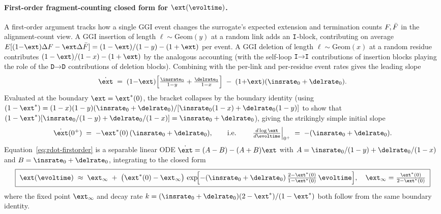 \paragraph{First-order fragment-counting closed form for $\fragext(\evoltime)$.}
A first-order argument tracks how a single GGI event changes the surrogate's
expected extension and termination counts $F, \bar F$ in the alignment-count
view.  A GGI insertion of length $\ell\sim\mathrm{Geom}(y)$ at a random link
adds an $\mathtt{I}$-block, contributing on average $E[(1{-}\fragext)\Delta F -
\fragext\Delta\nfragend] = (1-\fragext)/(1-y) - (1+\fragext)$ per event.  A GGI
deletion of length $\ell\sim\mathrm{Geom}(x)$ at a random residue contributes
$(1-\fragext)/(1-x) - (1+\fragext)$ by the analogous accounting (with the
self-loop $\mathtt{I}{\to}\mathtt{I}$ contributions of insertion blocks playing the role of
the $\mathtt{D}{\to}\mathtt{D}$ contributions of deletion blocks).  Combining with the
per-link and per-residue event rates gives the leading slope
\begin{equation}
\label{eq:rdot-firstorder}
\dot\fragext \;=\; (1{-}\fragext)\!\left[\tfrac{\insrate_0}{1-y}+\tfrac{\delrate_0}{1-x}\right]
\;-\; (1{+}\fragext)(\insrate_0+\delrate_0).
\end{equation}
Evaluated at the boundary $\fragext=\fragext^\ast(0)$, the bracket collapses by
the boundary identity (using
$(1-\fragext^\ast)= (1-x)(1-y)(\insrate_0+\delrate_0)/[\insrate_0(1-x)+\delrate_0(1-y)]$
to show that
$(1-\fragext^\ast)[\insrate_0/(1-y)+\delrate_0/(1-x)] = \insrate_0+\delrate_0$),
giving the strikingly simple initial slope
\begin{equation}
\label{eq:rdot-clean}
\dot\fragext(0^+) \;=\; -\fragext^\ast(0)\,(\insrate_0+\delrate_0),
\qquad\text{i.e.}\qquad
\left.\tfrac{d\log\fragext}{d\evoltime}\right|_{0^+} \;=\; -(\insrate_0+\delrate_0).
\end{equation}
Equation~\eqref{eq:rdot-firstorder} is a separable linear ODE
$\dot\fragext = (A-B) - (A+B)\fragext$ with $A = \insrate_0/(1-y)+\delrate_0/(1-x)$
and $B = \insrate_0+\delrate_0$, integrating to the closed form
\begin{equation}
\label{eq:r-closedform}
\boxed{\;\fragext(\evoltime) \;\approx\; \fragext_\infty
\;+\; \bigl(\fragext^\ast(0)-\fragext_\infty\bigr)\,
\exp\!\Bigl[-(\insrate_0+\delrate_0)\,\tfrac{2-\fragext^\ast(0)}{1-\fragext^\ast(0)}\,\evoltime\Bigr],\quad
\fragext_\infty = \tfrac{\fragext^\ast(0)}{2-\fragext^\ast(0)}\;}
\end{equation}
where the fixed point $\fragext_\infty$ and decay rate
$k=(\insrate_0+\delrate_0)(2-\fragext^\ast)/(1-\fragext^\ast)$ both follow from
the same boundary identity.

